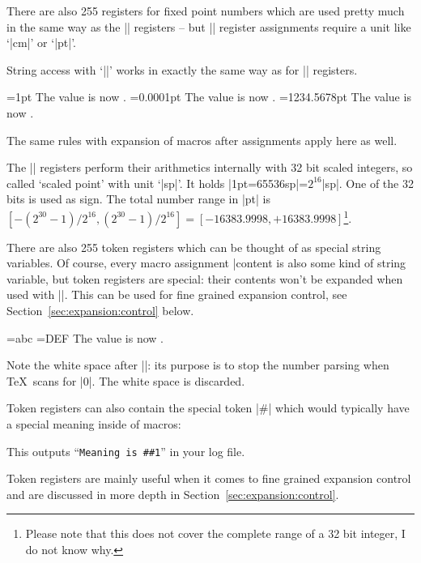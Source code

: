 \documentclass[a4paper]{ltxdoc}
\begin{document}
\begin{command}{\dimen{}}
	There are also 255 registers for fixed point numbers which are used pretty much in the same way as the |\count| registers -- but |\dimen| register assignments require a unit like `|cm|' or `|pt|'.

	String access with `|\the|' works in exactly the same way as for |\count| registers.
\begin{codeexample}[]
=1pt
The value is now \the{}.
=0.0001pt
The value is now \the{}.
\def\macro{1234.5678}
=\macro pt
The value is now \the{}.
\end{codeexample}
	The same rules with expansion of macros after assignments apply here as well.

	The |\dimen| registers perform their arithmetics internally with 32 bit scaled integers, so called `scaled point' with unit `|sp|'. It holds |1pt=65536sp|=$2^{16}$|sp|. One of the 32 bits is used as sign. The total number range in |pt| is $[-(2^{30}-1)/2^{16}, (2^{30}-1)/2^{16} ] = [-16383.9998,+16383.9998]$\footnote{Please note that this does not cover the complete range of a 32 bit integer, I do not know why.}.
\end{command}

\begin{command}{\toks{}}
\label{cmd:toks}
	There are also 255 token registers which can be thought of as special string variables. Of course, every macro assignment |\def\macro|\marg{content} is also some kind of string variable, but token registers are special: their contents won't be expanded when used with |\the\toks|. This can be used for fine grained expansion control, see Section~\ref{sec:expansion:control} below.

\begin{codeexample}[]
={abc}%
={DEF}%
The value is now \the{} \the{}.
\end{codeexample}
	Note the white space after |\the{}|: its purpose is to stop the number parsing when \TeX\ scans for |0|. The white space is discarded.

	Token registers can also contain the special token |#| which would typically have a special meaning inside of macros:
	This outputs ``\texttt{Meaning is \#\#1}'' in your log file.

	Token registers are mainly useful when it comes to fine grained expansion control and are discussed in more depth in Section~\ref{sec:expansion:control}.
\end{command}
\end{document}
